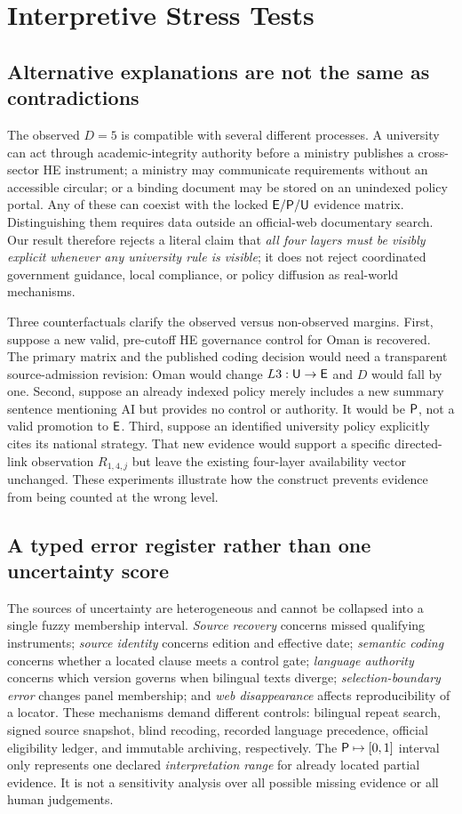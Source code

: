 \section{Interpretive Stress Tests}
\subsection{Alternative explanations are not the same as contradictions}
The observed $D=5$ is compatible with several different processes. A university can act through academic-integrity authority before a ministry publishes a cross-sector HE instrument; a ministry may communicate requirements without an accessible circular; or a binding document may be stored on an unindexed policy portal. Any of these can coexist with the locked $\textsf{E}/\textsf{P}/\textsf{U}$ evidence matrix. Distinguishing them requires data outside an official-web documentary search. Our result therefore rejects a literal claim that \emph{all four layers must be visibly explicit whenever any university rule is visible}; it does not reject coordinated government guidance, local compliance, or policy diffusion as real-world mechanisms.

Three counterfactuals clarify the observed versus non-observed margins. First, suppose a new valid, pre-cutoff HE governance control for Oman is recovered. The primary matrix and the published coding decision would need a transparent source-admission revision: Oman would change $L3:\textsf{U}\rightarrow\textsf{E}$ and $D$ would fall by one. Second, suppose an already indexed policy merely includes a new summary sentence mentioning AI but provides no control or authority. It would be $\textsf{P}$, not a valid promotion to $\textsf{E}$. Third, suppose an identified university policy explicitly cites its national strategy. That new evidence would support a specific directed-link observation $R_{1,4,j}$ but leave the existing four-layer availability vector unchanged. These experiments illustrate how the construct prevents evidence from being counted at the wrong level.

\subsection{A typed error register rather than one uncertainty score}
The sources of uncertainty are heterogeneous and cannot be collapsed into a single fuzzy membership interval. \emph{Source recovery} concerns missed qualifying instruments; \emph{source identity} concerns edition and effective date; \emph{semantic coding} concerns whether a located clause meets a control gate; \emph{language authority} concerns which version governs when bilingual texts diverge; \emph{selection-boundary error} changes panel membership; and \emph{web disappearance} affects reproducibility of a locator. These mechanisms demand different controls: bilingual repeat search, signed source snapshot, blind recoding, recorded language precedence, official eligibility ledger, and immutable archiving, respectively. The $\textsf{P}\mapsto[0,1]$ interval only represents one declared \emph{interpretation range} for already located partial evidence. It is not a sensitivity analysis over all possible missing evidence or all human judgements.


